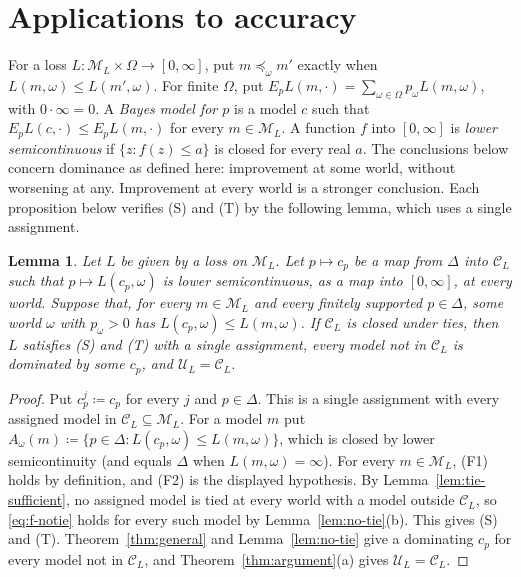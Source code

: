 \documentclass[11pt]{article}
\newtheorem{lemma}[theorem]{Lemma}
\theoremstyle{definition}
\theoremstyle{remark}
\newcommand{\M}{\mathcal M}
\newcommand{\C}{\mathcal C}
\newcommand{\U}{\mathcal U}
\begin{document}
\section{Applications to accuracy}\label{sec:short-applications}
For a loss $L:\M_L\times\Omega\to[0,\infty]$, put $m\preceq_\omega m'$ exactly when $L(m,\omega)\le L(m',\omega)$. For finite $\Omega$, put $E_pL(m,\cdot)=\sum_{\omega\in\Omega}p_\omega L(m,\omega)$, with $0\cdot\infty=0$. A \emph{Bayes model for $p$} is a model $c$ such that $E_pL(c,\cdot)\le E_pL(m,\cdot)$ for every $m\in\M_L$. A function $f$ into $[0,\infty]$ is \emph{lower semicontinuous} if $\{z:f(z)\le a\}$ is closed for every real $a$. The conclusions below concern dominance as defined here: improvement at some world, without worsening at any. Improvement at every world is a stronger conclusion. {\color{red}Each proposition below verifies {\color{red}(S)} and {\color{red}(T)} by the following lemma, which uses a single assignment.}

\begingroup\color{red}
\begin{lemma}\label{lem:loss-selection}
Let $L$ be given by a loss on $\M_L$. Let $p\mapsto c_p$ be a map from $\Delta$ into $\C_L$ such that $p\mapsto L(c_p,\omega)$ is lower semicontinuous, as a map into $[0,\infty]$, at every world. Suppose that, for every $m\in\M_L$ and every finitely supported $p\in\Delta$, some world $\omega$ with $p_\omega>0$ has $L(c_p,\omega)\le L(m,\omega)$. If $\C_L$ is closed under ties, then $L$ satisfies (S) and (T) with a single assignment, every model not in $\C_L$ is dominated by some $c_p$, and $\U_L=\C_L$.
\end{lemma}
\begin{proof}
Put $c^j_p\coloneqq c_p$ for every $j$ and $p\in\Delta$. This is a single assignment with every assigned model in $\C_L\subseteq\M_L$. For a model $m$ put $A_\omega(m)\coloneqq\{p\in\Delta:L(c_p,\omega)\le L(m,\omega)\}$, which is closed by lower semicontinuity (and equals $\Delta$ when $L(m,\omega)=\infty$). For every $m\in\M_L$, (F1) holds by definition, and (F2) is the displayed hypothesis. By Lemma~\ref{lem:tie-sufficient}, no assigned model is tied at every world with a model outside $\C_L$, so \eqref{eq:f-notie} holds for every such model by Lemma~\ref{lem:no-tie}(b). This gives (S) and (T). Theorem~\ref{thm:general} and Lemma~\ref{lem:no-tie} give a dominating $c_p$ for every model not in $\C_L$, and Theorem~\ref{thm:argument}(a) gives $\U_L=\C_L$.
\end{proof}
\endgroup
\end{document}
